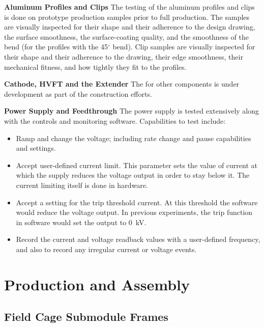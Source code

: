 {\bf Aluminum Profiles and Clips}
The  testing of the aluminum profiles and clips is done on prototype production samples prior to full production.   The samples are visually inspected for their shape and their adherence to the design drawing, the surface smoothness, the surface-coating quality, and the smoothness of the bend (for the profiles with the \num{45}$^{\circ}$ bend).  Clip samples are visually inspected for their shape and their adherence to the drawing, their edge smoothness, their mechanical fitness, and how tightly they fit to the profiles. 


{\bf Cathode, HVFT and the Extender} The  for other components is under development as part of the  construction efforts.


{\bf Power Supply and Feedthrough} The power supply is tested extensively along with the controls and monitoring software.  %
Capabilities to test include:
\begin{itemize}
\item Ramp and change the voltage; including rate change and pause capabilities and settings. 
\item Accept user-defined current limit.  This parameter sets the value of current at which the supply reduces the voltage output in order to stay below it.  The current limiting itself is done in hardware.
\item Accept a setting for the trip threshold current.  At this threshold the software would reduce the voltage output. 
In previous experiments, the trip function in software would set the output to \SI{0}{kV}. 
\item Record the current and voltage readback values with a user-defined frequency, and also to record any irregular current or voltage events. 
\end{itemize}


\section{Production and Assembly}
\label{sec:fddp-hv-prod-assy}

\subsection{Field Cage Submodule Frames}
\label{sec:fddp-hv-prod-assy-fc-frames}


